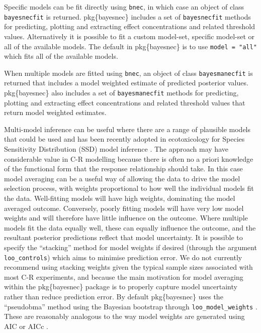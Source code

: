\documentclass[
]{jss}
\begin{document}
Specific models can be fit directly using \texttt{bnec}, in which case
an object of class \texttt{bayesnecfit} is returned. pkg\{bayesnec\}
includes a set of \texttt{bayesnecfit} methods for predicting, plotting
and extracting effect concentrations and related threshold values.
Alternatively it is possible to fit a custom model-set, specific
model-set or all of the available models. The default in pkg\{bayesnec\}
is to use \texttt{model\ =\ "all"} which fits all of the available
models.

When multiple models are fitted using \texttt{bnec}, an object of class
\texttt{bayesmanecfit} is returned that includes a model weighted
estimate of predicted posterior values. pkg\{bayesnec\} also includes a
set of \texttt{bayesmanecfit} methods for predicting, plotting and
extracting effect concentrations and related threshold values that
return model weighted estimates.

Multi-model inference can be useful where there are a range of plausible
models that could be used \citep{Burnham2002} and has been recently
adopted in ecotoxicology for Species Sensitivity Distribution (SSD)
model inference \citep{Thorley2018, fox2020, Dalgarno}. The approach may
have considerable value in C-R modelling because there is often no a
priori knowledge of the functional form that the response relationship
should take. In this case model averaging can be a useful way of
allowing the data to drive the model selection process, with weights
proportional to how well the individual models fit the data.
Well-fitting models will have high weights, dominating the model
averaged outcome. Conversely, poorly fitting models will have very low
model weights and will therefore have little influence on the outcome.
Where multiple models fit the data equally well, these can equally
influence the outcome, and the resultant posterior predictions reflect
that model uncertainty. It is possible to specify the ``stacking''
method \citep{Yao2018} for model weights if desired (through the
argument \texttt{loo\_controls}) which aims to minimise prediction
error. We do not currently recommend using stacking weights given the
typical sample sizes associated with most C-R experiments, and because
the main motivation for model averaging within the pkg\{bayesnec\}
package is to properly capture model uncertainty rather than reduce
prediction error. By default pkg\{bayesnec\} uses the ``pseudobma''
method using the Bayesian bootstrap through \texttt{loo\_model\_weights}
\citep{vehtari2020, vehtari2017}. These are reasonably analogous to the
way model weights are generated using AIC or AICc \citep{Burnham2002}.
\end{document}
